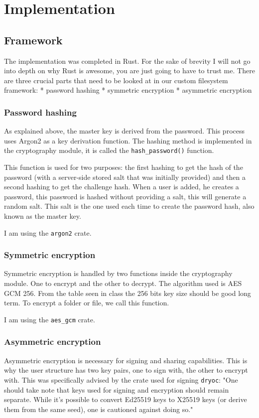 \section{Implementation}
\subsection{Framework}
The implementation was completed in Rust. For the sake of brevity I will not go into depth on why Rust is awesome, you are just going to have to trust me. There are three crucial parts that need to be looked at in our custom filesystem framework:
* password hashing
* symmetric encryption
* asymmetric encryption

\subsubsection{Password hashing}

As explained above, the master key is derived from the password. This process uses Argon2\cite{argon2} as a key derivation function. The hashing method is implemented in the cryptography module, it is called the \lstinline{hash_password()} function\cite{hashpass}.

This function is used for two purposes: the first hashing to get the hash of the password (with a server-side stored salt that was initially provided) and then a second hashing to get the challenge hash. When a user is added, he creates a password, this password is hashed without providing a salt, this will generate a random salt. This salt is the one used each time to create the password hash, also known as the master key. 

I am using the \lstinline{argon2} crate\cite{argon2docs}.

\subsubsection{Symmetric encryption}
Symmetric encryption is handled by two functions inside the cryptography module. One to encrypt and the other to decrypt. The algorithm used is AES GCM 256. From the table seen in class the 256 bits key size should be good long term. To encrypt a folder or file, we call this function.

I am using the \lstinline{aes_gcm} crate\cite{aesgcm}.

\subsubsection{Asymmetric encryption}
Asymmetric encryption is necessary for signing and sharing capabilities. This is why the user structure has two key pairs, one to sign with, the other to encrypt with. This was specifically advised by the crate used for signing \lstinline{dryoc}: "One should take note that keys used for signing and encryption should remain separate. While it’s possible to convert Ed25519 keys to X25519 keys (or derive them from the same seed), one is cautioned against doing so."\cite{dryocsign}

